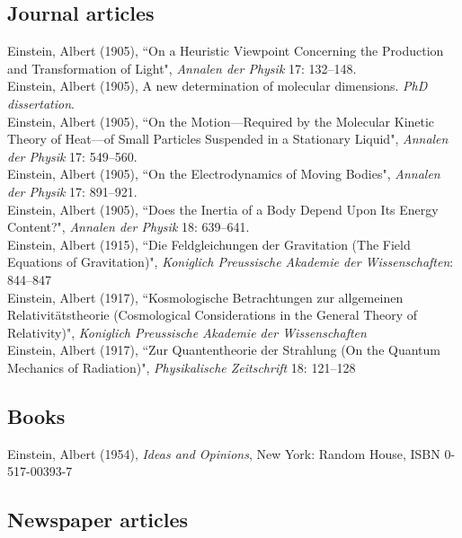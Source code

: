 \documentclass[11pt]{article} %
\begin{document}
\subsection*{Journal articles}


Einstein, Albert (1905), “On a Heuristic Viewpoint Concerning the Production and Transformation of Light", \emph{Annalen der Physik} 17: 132–148.\\
Einstein, Albert (1905), A new determination of molecular dimensions. \emph{PhD dissertation}.\\
Einstein, Albert (1905), “On the Motion—Required by the Molecular Kinetic Theory of Heat—of Small Particles Suspended in a Stationary Liquid", \emph{Annalen der Physik} 17: 549–560.\\
Einstein, Albert (1905), “On the Electrodynamics of Moving Bodies", \emph{Annalen der Physik} 17: 891–921.\\
Einstein, Albert (1905), “Does the Inertia of a Body Depend Upon Its Energy Content?", \emph{Annalen der Physik} 18: 639–641.\\
Einstein, Albert (1915), “Die Feldgleichungen der Gravitation (The Field Equations of Gravitation)", \emph{Koniglich Preussische Akademie der Wissenschaften}: 844–847\\
Einstein, Albert (1917), “Kosmologische Betrachtungen zur allgemeinen Relativitätstheorie (Cosmological Considerations in the General Theory of Relativity)", \emph{Koniglich Preussische Akademie der Wissenschaften}\\
Einstein, Albert (1917), “Zur Quantentheorie der Strahlung (On the Quantum Mechanics of Radiation)", \emph{Physikalische Zeitschrift} 18: 121–128


\subsection*{Books}

Einstein, Albert (1954), \emph{Ideas and Opinions}, New York: Random House, ISBN 0-517-00393-7


\subsection*{Newspaper articles}
\end{document}
